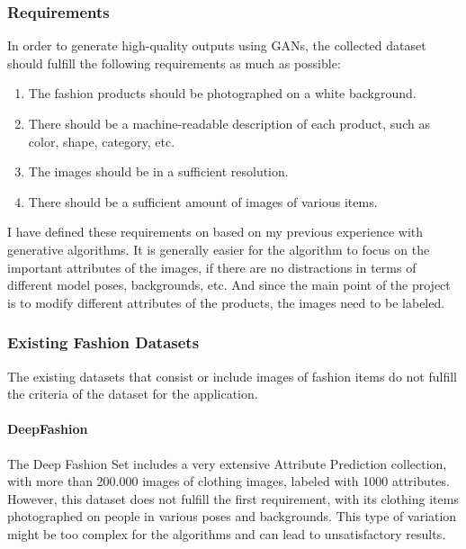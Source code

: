 \documentclass{article}
\begin{document}
\subsubsection {Requirements}

In order to generate high-quality outputs using GANs, the collected dataset should fulfill the following requirements as much as possible:
\begin{enumerate}
\item The fashion products should be photographed on a white background. 
\item There should be a machine-readable description of each product, such as color, shape, category, etc. 
\item The images should be in a sufficient resolution.
\item There should be a sufficient amount of images of various items.

\end{enumerate}
I have defined these requirements on based on my previous experience with generative algorithms. It is generally easier for the algorithm to focus on the important attributes of the images, if there are no distractions in terms of different model poses, backgrounds, etc. And since the main point of the project is to modify different attributes of the products, the images need to be labeled.

\subsubsection {Existing Fashion Datasets}

The existing datasets that consist or include images of fashion items do not fulfill the criteria of the dataset for the application. 

\paragraph{DeepFashion}
The Deep Fashion Set \cite{the_chinese_university_of_hong_kong_deepfashion_nodate} includes a very extensive Attribute Prediction collection, with more than 200.000 images of clothing images, labeled with 1000 attributes. However, this dataset does not fulfill the first requirement, with its clothing items photographed on people in various poses and backgrounds. This type of variation might be too complex for the algorithms and can lead to unsatisfactory results.
\end{document}
